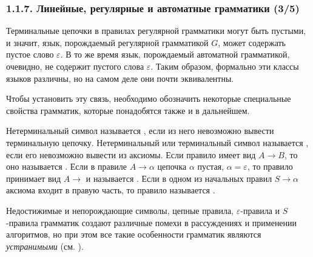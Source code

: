 \begin{frame}
\frametitle{1.1.7. Линейные, регулярные и автоматные грамматики (3/5)}

Терминальные цепочки в правилах регулярной грамматики могут быть
пустыми, и значит, язык, порождаемый регулярной грамматикой $G$,
может содержать пустое слово $\varepsilon$.  В то же время язык,
порождаемый автоматной грамматикой, очевидно, не содержит пустого
слова $\varepsilon$. 
Таким образом, формально эти классы языков различны, но на самом деле они почти эквивалентны.

\smallskip
Чтобы установить эту связь,
необходимо обозначить некоторые специальные свойства
грамматик, которые понадобятся также и в дальнейшем.    

Нетерминальный символ называется
,
если из него невозможно вывести терминальную цепочку.
Нетерминальный или терминальный  символ называется
,
если его невозможно вывести из аксиомы.
Если правило имеет вид $A\rightarrow B$, то оно называется
. 
Если в правиле $A\rightarrow
\alpha$ цепочка $\alpha$ пустая,
$\alpha=\varepsilon$, то правило принимает вид 
$A\rightarrow$  и называется
.
Если в одном из начальных правил $S\rightarrow \alpha$
аксиома входит в правую часть,
то правило называется 
.

Недостижимые и непорождающие символы, цепные правила,
$\varepsilon$-правила и $S$-правила грамматик
создают различные помехи в рассуждениях и применении алгоритмов, но при этом все такие особенности грамматик являются {\em устранимыми} (см. ).

\end{frame}


